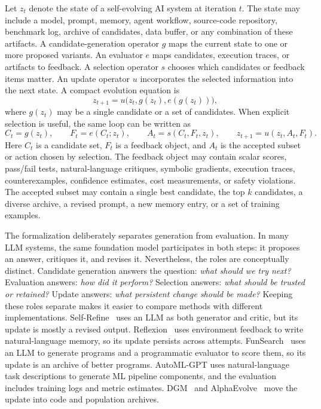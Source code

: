 Let $z_t$ denote the state of a self-evolving AI system at iteration $t$.  The state may include a model, prompt, memory, agent workflow, source-code repository, benchmark log, archive of candidates, data buffer, or any combination of these artifacts.  A candidate-generation operator $g$ maps the current state to one or more proposed variants.  An evaluator $e$ maps candidates, execution traces, or artifacts to feedback.  A selection operator $s$ chooses which candidates or feedback items matter.  An update operator $u$ incorporates the selected information into the next state.  A compact evolution equation is
\begin{equation}
  z_{t+1} = u\bigl(z_t, g(z_t), e(g(z_t))\bigr),
  \label{eq:general-evolution-loop}
\end{equation}
where $g(z_t)$ may be a single candidate or a set of candidates.  When explicit selection is useful, the same loop can be written as
\begin{equation}
  C_t = g(z_t), \qquad F_t = e(C_t; z_t), \qquad A_t = s(C_t, F_t, z_t), \qquad z_{t+1}=u(z_t,A_t,F_t).
  \label{eq:expanded-evolution-loop}
\end{equation}
Here $C_t$ is a candidate set, $F_t$ is a feedback object, and $A_t$ is the accepted subset or action chosen by selection.  The feedback object may contain scalar scores, pass/fail tests, natural-language critiques, symbolic gradients, execution traces, counterexamples, confidence estimates, cost measurements, or safety violations.  The accepted subset may contain a single best candidate, the top $k$ candidates, a diverse archive, a revised prompt, a new memory entry, or a set of training examples.

The formalization deliberately separates generation from evaluation.  In many LLM systems, the same foundation model participates in both steps: it proposes an answer, critiques it, and revises it.  Nevertheless, the roles are conceptually distinct.  Candidate generation answers the question: \emph{what should we try next?}  Evaluation answers: \emph{how did it perform?}  Selection answers: \emph{what should be trusted or retained?}  Update answers: \emph{what persistent change should be made?}  Keeping these roles separate makes it easier to compare methods with different implementations.  Self-Refine~\cite{selfrefine2023} uses an LLM as both generator and critic, but its update is mostly a revised output.  Reflexion~\cite{reflexion2023} uses environment feedback to write natural-language memory, so its update persists across attempts.  FunSearch~\cite{funsearch2024} uses an LLM to generate programs and a programmatic evaluator to score them, so its update is an archive of better programs.  AutoML-GPT uses natural-language task descriptions to generate ML pipeline components, and the evaluation includes training logs and metric estimates.  DGM~\cite{darwingodelmachine2025} and AlphaEvolve~\cite{alphaevolve2025} move the update into code and population archives.


